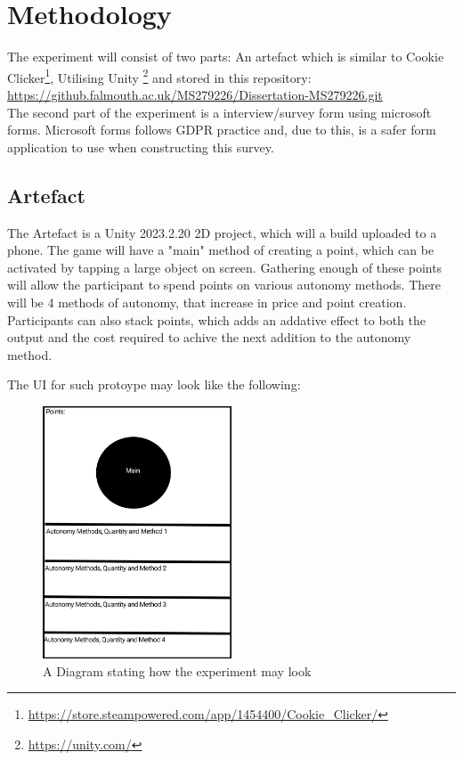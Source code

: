 \documentclass[conference]{IEEEtran}
\begin{document}
\section{Methodology}
 The experiment will consist of two parts: An artefact which is similar to Cookie Clicker\footnote{\url{https://store.steampowered.com/app/1454400/Cookie_Clicker/}}, Utilising Unity \footnote{\url{https://unity.com/}} and stored in this repository:\\

\url{https://github.falmouth.ac.uk/MS279226/Dissertation-MS279226.git}\\

The second part of the experiment is a interview/survey form using microsoft forms. Microsoft forms follows GDPR practice and, due to this, is a safer form application to use when constructing this survey.

\subsection{Artefact}
The Artefact is a Unity 2023.2.20 2D project, which will a build uploaded to a phone. The game will have a "main" method of creating a point, which can be activated by tapping a large object on screen. Gathering enough of these points will allow the participant to spend points on various autonomy methods. There will be 4 methods of autonomy, that increase in price and point creation. Participants can also stack points, which adds an addative effect to both the output and the cost required to achive the next addition to the autonomy method.

The UI for such protoype may look like the following:

\begin{figure}[H]
\includegraphics[width = 0.5\textwidth]{PrototypeUI}
\caption{A Diagram stating how the experiment may look}
\end{figure}
\end{document}
